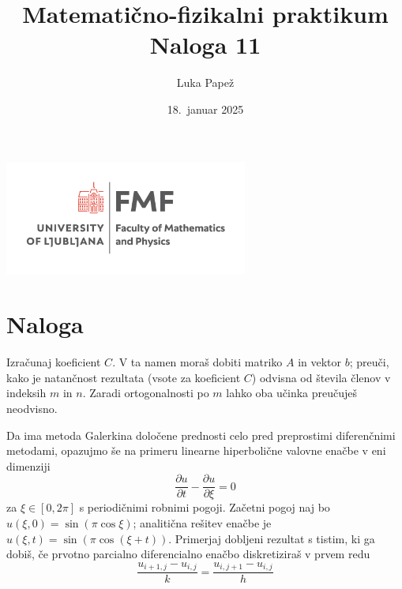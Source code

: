 \documentclass{article}
\begin{document}
\title{Matematično-fizikalni praktikum \\[3mm] \large Naloga 11}
\author{Luka Papež}
\date{18.\ januar 2025}

\begin{center}
    \includegraphics[width=8cm]{logo-fmf.png}
\end{center}

{
    \let\newpage\relax
    \maketitle
}

\maketitle
\newpage
\section{Naloga}
Izračunaj koeficient $C$.  V ta namen moraš dobiti matriko $A$
in vektor $b$; preuči, kako je natančnost rezultata
(vsote za koeficient $C$) odvisna od števila členov
v indeksih $m$ in $n$. Zaradi ortogonalnosti
po $m$ lahko oba učinka preučuješ neodvisno.

\medskip


Da ima metoda Galerkina določene prednosti celo pred preprostimi
diferenčnimi metodami, opazujmo še na primeru linearne hiperbolične
valovne enačbe v eni dimenziji
\begin{equation*}
  \frac{\partial u}{\partial t} - \frac{\partial u}{\partial \xi} = 0
\end{equation*}
za $\xi \in[0,2\pi]$ s periodičnimi robnimi pogoji.
Začetni pogoj naj bo $u(\xi,0)=\sin(\pi\cos \xi)$;
analitična rešitev enačbe je $u(\xi,t)=\sin(\pi\cos(\xi+t))$.
Primerjaj dobljeni rezultat s tistim, ki ga dobiš,
če prvotno parcialno diferencialno enačbo diskretiziraš
v prvem redu
\begin{equation*}
\frac{u_{i+1,j} - u_{i,j}}{ k} = \frac{u_{i,j+1} - u_{i,j}}{ h}
\end{equation*}
\end{document}
